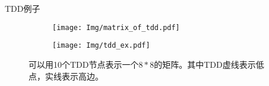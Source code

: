 \documentclass[aspectratio=1610]{ctexbeamer}
\begin{document}
\begin{frame}{TDD例子}
    \begin{figure}
        \begin{subfigure}{0.4\textwidth}
            \texttt{[image: Img/matrix\_of\_tdd.pdf]}
            \label{fig:mat_P}
        \end{subfigure}
        \qquad
        \qquad
        \qquad
        \begin{subfigure}[c]{0.4\textwidth}
            \centering
            \texttt{[image: Img/tdd\_ex.pdf]}
            \label{fig:tdd_P}
        \end{subfigure}
        \label{fig:P}
        \caption{可以用10个TDD节点表示一个$8*8$的矩阵。其中TDD虚线表示低点，实线表示高边。}
    \end{figure}
\end{frame}
        

        
\end{document}
